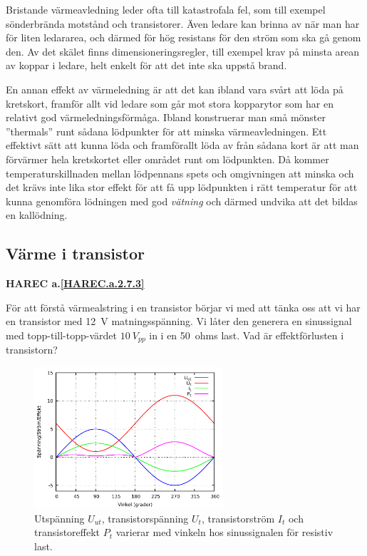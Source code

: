Bristande värmeavledning leder ofta till katastrofala fel, som till exempel
sönderbrända motstånd och transistorer. Även ledare kan brinna av när man
har för liten ledararea, och därmed för hög resistans för den ström som
ska gå genom den. Av det skälet finns dimensioneringsregler, till exempel
krav på minsta arean av koppar i ledare, helt enkelt för att det inte ska
uppstå brand.

En annan effekt av värmeledning är att det kan ibland vara svårt att löda
på kretskort, framför allt vid ledare som går mot stora kopparytor som
har en relativt god värmeledningsförmåga. Ibland konstruerar man små mönster
''thermals'' runt sådana lödpunkter för att minska värmeavledningen.
Ett effektivt sätt att kunna löda och framförallt löda av från sådana
kort är att man förvärmer hela kretskortet eller området runt om
lödpunkten. Då kommer temperaturskillnaden mellan lödpennans spets och
omgivningen att minska och det krävs inte lika stor effekt för att få
upp lödpunkten i rätt temperatur för att kunna genomföra lödningen med god
\emph{vätning} och därmed undvika att det bildas en kallödning.

\subsection{Värme i transistor}
\textbf{
HAREC a.\ref{HAREC.a.2.7.3}\label{myHAREC.a.2.7.3}
}

För att förstå värmealstring i en transistor börjar vi med att tänka oss
att vi har en transistor med 12~V matningsspänning. Vi låter den generera en
sinussignal med topp-till-topp-värdet \(10\ V_{pp}\) in i en 50~ohms last.
Vad är effektförlusten i transistorn?

\begin{figure}[ht]
\begin{center}
\includegraphics[width=7cm]{images/power1.pdf}
\caption{Utspänning $U_{ut}$, transistorspänning $U_t$, transistorström $I_t$ och transistoreffekt $P_t$ varierar med vinkeln hos sinussignalen för resistiv last.}
\label{fig:power1}
\end{center}
\end{figure}

